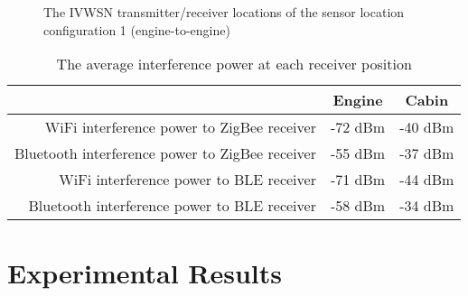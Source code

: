 \documentclass[journal]{IEEEtran}
\begin{document}
\begin{figure*}[tbp]
\centering
{}
\caption{The IVWSN transmitter/receiver locations of the sensor location configuration 1 (engine-to-engine)}
\label{CP2_NodeConf1}
\end{figure*}



\begin{table}[tbp]
  \centering
  \caption{The average interference power at each receiver position}
    \begin{tabular}{rcc}
    \toprule
          & Engine & Cabin \\
    \midrule
    WiFi interference power to ZigBee receiver & -72 dBm & -40 dBm \\
    Bluetooth interference power to ZigBee receiver & -55 dBm & -37 dBm \\
    WiFi interference power to BLE receiver & -71 dBm & -44 dBm \\
    Bluetooth interference power to BLE receiver & -58 dBm & -34 dBm \\
    \bottomrule
    \end{tabular}\label{Interference_power}\end{table}

\section{Experimental Results}
\end{document}
